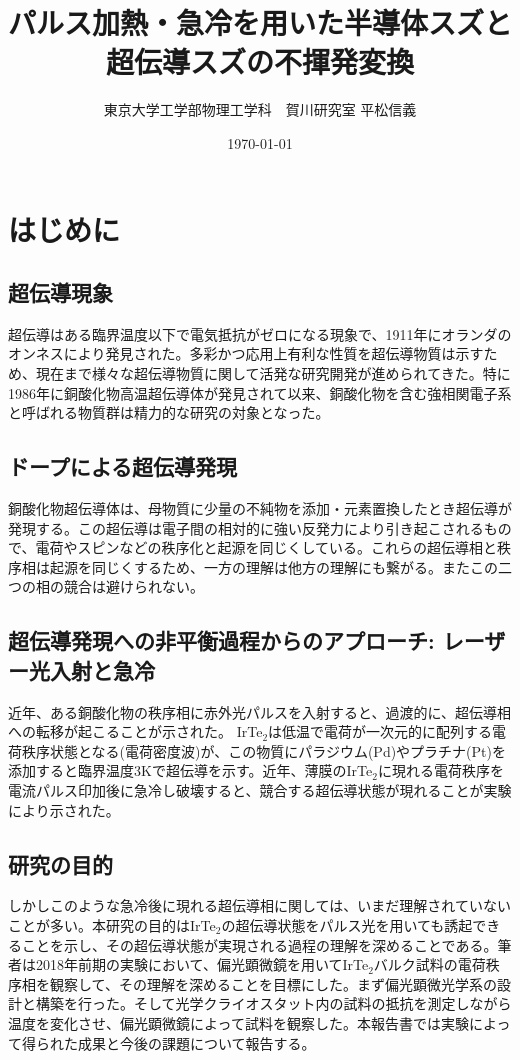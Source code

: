 \documentclass[11pt,a4paper]{jsarticle}
\title{パルス加熱・急冷を用いた半導体スズと超伝導スズの不揮発変換}
\author{東京大学工学部物理工学科　賀川研究室 平松信義}
\date{\today}
\begin{document}
\maketitle

\tableofcontents
\newpage

\section{はじめに}
\subsection{超伝導現象}
超伝導はある臨界温度以下で電気抵抗がゼロになる現象で、1911年にオランダのオンネスにより発見された。多彩かつ応用上有利な性質を超伝導物質は示すため、現在まで様々な超伝導物質に関して活発な研究開発が進められてきた。特に1986年に銅酸化物高温超伝導体が発見されて以来、銅酸化物を含む強相関電子系と呼ばれる物質群は精力的な研究の対象となった。

\subsection{ドープによる超伝導発現}
銅酸化物超伝導体は、母物質に少量の不純物を添加・元素置換したとき超伝導が発現する。この超伝導は電子間の相対的に強い反発力により引き起こされるもので、電荷やスピンなどの秩序化と起源を同じくしている。これらの超伝導相と秩序相は起源を同じくするため、一方の理解は他方の理解にも繋がる。またこの二つの相の競合は避けられない。

\subsection{超伝導発現への非平衡過程からのアプローチ: レーザー光入射と急冷}
近年、ある銅酸化物の秩序相に赤外光パルスを入射すると、過渡的に、超伝導相への転移が起こることが示された\cite{Fausti}。
IrTe$_2$は低温で電荷が一次元的に配列する電荷秩序状態となる(電荷密度波)が、この物質にパラジウム(Pd)やプラチナ(Pt)を添加すると臨界温度3Kで超伝導を示す。\cite{}近年、薄膜のIrTe$_2$に現れる電荷秩序を電流パルス印加後に急冷し破壊すると、競合する超伝導状態が現れることが実験により示された\cite{SC_IrTe2}。

\subsection{研究の目的}
しかしこのような急冷後に現れる超伝導相に関しては、いまだ理解されていないことが多い。本研究の目的はIrTe$_2$の超伝導状態をパルス光を用いても誘起できることを示し、その超伝導状態が実現される過程の理解を深めることである。筆者は2018年前期の実験において、偏光顕微鏡を用いてIrTe$_2$バルク試料の電荷秩序相を観察して、その理解を深めることを目標にした。まず偏光顕微光学系の設計と構築を行った。そして光学クライオスタット内の試料の抵抗を測定しながら温度を変化させ、偏光顕微鏡によって試料を観察した。本報告書では実験によって得られた成果と今後の課題について報告する。
\end{document}
